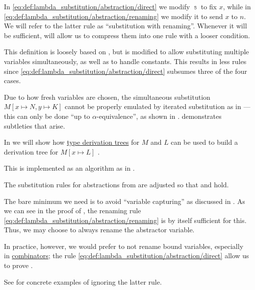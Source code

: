 \begin{comments}
  \item In \eqref{eq:def:lambda_substitution/abstraction/direct} we modify \( \Bbbs \) to fix \( x \), while in \eqref{eq:def:lambda_substitution/abstraction/renaming} we modify it to send \( x \) to \( n \). We will refer to the latter rule as \enquote{substitution with renaming}. Whenever it will be sufficient,  will allow us to compress them into one rule with a looser condition.

  \item This definition is loosely based on \cite[def. 1A7]{Hindley1997STT}, but is modified to allow substituting multiple variables simultaneously, as well as to handle constants. This results in less rules since \eqref{eq:def:lambda_substitution/abstraction/direct} subsumes three of the four cases.

  \item Due to how fresh variables are chosen, the simultaneous substitution \( M[x \mapsto N, y \mapsto K] \) cannot be properly emulated by iterated substitution as in  --- this can only be done \enquote{up to \( \alpha \)-equivalence}, as shown in .  demonstrates subtleties that arise.

  \item In  we will show how \hyperref[def:type_derivation_tree]{type derivation trees} for \( M \) and \( L \) can be used to build a derivation tree for \( M[x \mapsto L] \) .

  \item This is implemented as an algorithm as  in \cite{notebook:code}.
\end{comments}

\begin{remark}\label{rem:renaming_substitution_rules}
  The substitution rules for abstractions from  are adjusted so that  and  hold.

  The bare minimum we need is to avoid \enquote{variable capturing} as discussed in . As we can see in the proof of , the renaming rule \eqref{eq:def:lambda_substitution/abstraction/renaming} is by itself sufficient for this. Thus, we may choose to always rename the abstractor variable.

  In practice, however, we would prefer to not rename bound variables, especially in \hyperref[def:lambda_combinator]{combinators}; the rule \eqref{eq:def:lambda_substitution/abstraction/direct} allow us to prove .

  See  for concrete examples of ignoring the latter rule.
\end{remark}

